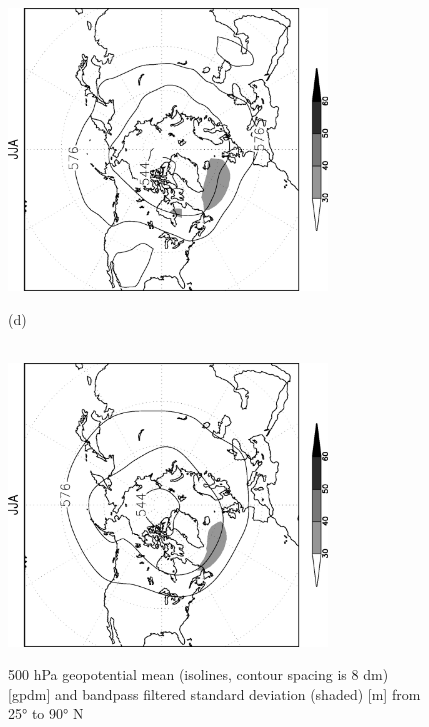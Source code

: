 \documentclass[12pt,a4paper,twoside,openright,headinclude,liststotoc,bibtotoc]{scrreprt}
\begin{document}
\begin{figure}[c]
{\includegraphics[height=7.5cm,angle=-90]
{eps/NHz500StdbpJJA.eps}
}
\parbox{8.5cm}{\hspace{0.02cm}\begin{scriptsize}(d)\end{scriptsize} \vspace{-0.3cm} \\
\includegraphics[height=7.5cm,angle=-90]
{eps/NHt21z500StdbpJJA.eps}
}
\caption[Northern Hemisphere 500 hPa geopotential mean and bandpass filtered standard deviation]{500 hPa geopotential mean (isolines, contour spacing is 8 dm) [gpdm] and bandpass filtered standard deviation (shaded) [m] from 25° to 90° N}
\label{img:z500N}
\end{figure}
\end{document}
